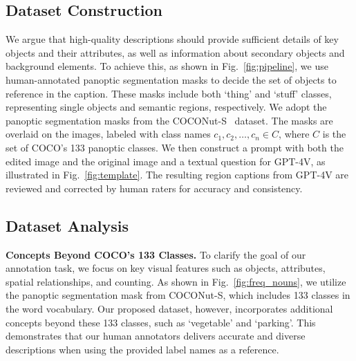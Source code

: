 \subsection{Dataset Construction}
We argue that high-quality descriptions should provide sufficient details of key objects and their attributes, as well as information about secondary objects and background elements. To achieve this, as shown in Fig.~\ref{fig:pipeline}, we use human-annotated panoptic segmentation masks to decide the set of objects to reference in the caption. These masks include both `thing' and `stuff' classes, representing single objects and semantic regions, respectively.
We adopt the panoptic segmentation masks from the COCONut-S~\cite{deng2024coconut} dataset. The masks are overlaid on the images, labeled with class names $c_1, c_2, \dots, c_n \in C$, where $C$ is the set of COCO’s 133 panoptic classes. We then construct a prompt with both the edited image and the original image and a textual question for GPT-4V, as illustrated in Fig.~\ref{fig:template}.
The resulting region captions from GPT-4V are reviewed and corrected by human raters for accuracy and consistency. 







\subsection{Dataset Analysis}
\noindent\textbf{Concepts Beyond COCO's 133 Classes.} To clarify the goal of our annotation task, we focus on key visual features such as objects, attributes, spatial relationships, and counting. As shown in Fig.~\ref{fig:freq_nouns}, we utilize the panoptic segmentation mask from COCONut-S, which includes 133 classes in the word vocabulary. Our proposed dataset, however, incorporates additional concepts beyond these 133 classes, such as `vegetable' and `parking'. This demonstrates that our human annotators delivers accurate and diverse descriptions when using the provided label names as a reference.



